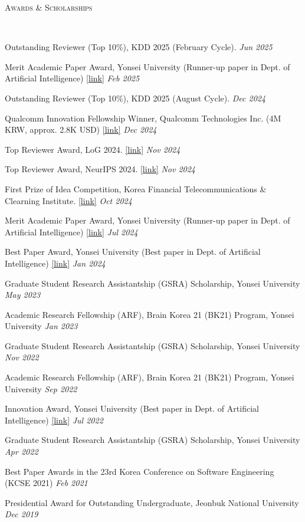 \documentclass[10pt]{article}
\newenvironment{changemargin}[2]{
  \begin{list}{}{
    \setlength{\topsep}{0pt}
    \setlength{\leftmargin}{#1}
    \setlength{\rightmargin}{#2}
    \setlength{\listparindent}{\parindent}
    \setlength{\itemindent}{\parindent}
    \setlength{\parsep}{\parskip}
  }
  \item[]}{\end{list}
}
\newcommand{\lineover}{
	\begin{changemargin}{-0.05in}{-0.05in}
		\vspace*{-8pt}
		\hrulefill \\
		\vspace*{-2pt}
	\end{changemargin}
}
\newcommand{\header}[1]{
	\begin{changemargin}{-0.5in}{-0.5in}
		\scshape{#1}\\
  	\lineover
	\end{changemargin}
}
\newcommand{\award}[2]{
	{#1} \hfill \emph{#2}\\ \medskip
}
\newenvironment{body} {
	\vspace*{-16pt}
	\begin{changemargin}{-0.25in}{-0.5in}
  }
	{\end{changemargin}
}
\begin{document}
\header{Awards \& Scholarships}
\begin{body}
	\vspace{14pt}
\award{Outstanding Reviewer (Top 10\%), KDD 2025 (February Cycle).} {Jun 2025}
\award{Merit Academic Paper Award, Yonsei University (Runner-up paper in Dept. of Artificial Intelligence) \href{https://graduate.yonsei.ac.kr/graduate/board/news.do?mode=view&articleNo=220032&article.offset=0&articleLimit=10}{[link]}} {Feb 2025} 
\award{Outstanding Reviewer (Top 10\%), KDD 2025 (August Cycle).} {Dec 2024}
\award{Qualcomm Innovation Fellowship Winner, Qualcomm Technologies Inc. (4M KRW, approx. 2.8K USD) \href{https://www.qualcomm.com/research/university-relations/innovation-fellowship/2024-south-korea}{[link]}} {Dec 2024} 
\award{Top Reviewer Award, LoG 2024. \href{https://x.com/LogConference/status/1862602407395697123}{[link]}} {Nov 2024}
\award{Top Reviewer Award, NeurIPS 2024. \href{https://neurips.cc/Conferences/2024/ProgramCommittee\#top-reviewers}{[link]}} {Nov 2024}
\award{First Prize of Idea Competition, Korea Financial Telecommunications \& Clearning Institute. \href{https://drive.google.com/file/d/1--cUGRX6rB9rc2phbMeIJ7BdHRNCj_au/view?usp=sharing}{[link]}} {Oct 2024}
\award{Merit Academic Paper Award, Yonsei University (Runner-up paper in Dept. of Artificial Intelligence) \href{https://graduate.yonsei.ac.kr/graduate/board/news.do?mode=view&articleNo=208151&article.offset=0&articleLimit=10}{[link]}} {Jul 2024} 
\award{Best Paper Award, Yonsei University (Best paper in Dept. of Artificial Intelligence) \href{https://graduate.yonsei.ac.kr/graduate/board/news.do?mode=view&articleNo=181558&article.offset=0&articleLimit=10}{[link]}} {Jan 2024} 
\award{Graduate Student Research Assistantship (GSRA) Scholarship, Yonsei University}{May 2023}
\award{Academic Research Fellowship (ARF), Brain Korea 21 (BK21) Program, Yonsei University}{Jan 2023}
\award{Graduate Student Research Assistantship (GSRA) Scholarship, Yonsei University}{Nov 2022}
\award{Academic Research Fellowship (ARF), Brain Korea 21 (BK21) Program, Yonsei University}{Sep 2022}
\award{Innovation Award, Yonsei University (Best paper in Dept. of Artificial Intelligence) \href{https://www.yonsei.ac.kr/ocx/news.jsp?mode=view&ar_seq=20220708141917269049&sr_volume=632&list_mode=list&sr_site=S&pager.offset=0&sr_cates=29}{[link]}}{Jul 2022}
\award{Graduate Student Research Assistantship (GSRA) Scholarship, Yonsei University}{Apr 2022}
\award{Best Paper Awards in the 23rd Korea Conference on Software Engineering (KCSE 2021)}{Feb 2021}
\award{Presidential Award for Outstanding Undergraduate, Jeonbuk National University}{Dec 2019}

\end{body}
\end{document}
